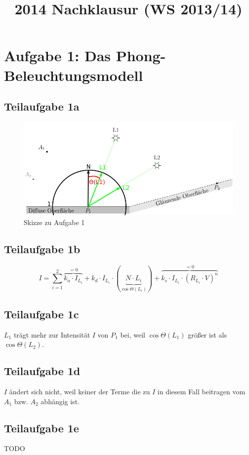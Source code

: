\documentclass[a4paper]{scrartcl}
\begin{document}
\title{2014 Nachklausur (WS 2013/14)}

\setcounter{section}{1}
\section*{Aufgabe 1: Das Phong-Beleuchtungsmodell}
\subsection*{Teilaufgabe 1a}
\begin{figure}[h]
    \centering
    \includegraphics*[width=0.8\linewidth, keepaspectratio]{1a.png}
    \caption{Skizze zu Aufgabe 1}
    \label{fig:1a}
\end{figure}

\subsection*{Teilaufgabe 1b}

\[I = \sum_{i=1}^2 \overbrace{k_a \cdot I_{L_i}}^{=0} + k_d \cdot I_{L_i} \cdot (\underbrace{N \cdot L_{i}}_{\cos \Theta({L_i})}) + \overbrace{k_s \cdot I_{L_i} \cdot (R_{L_i} \cdot V)^n}^{=0}\]

\subsection*{Teilaufgabe 1c}
$L_1$ trägt mehr zur Intensität $I$ von $P_1$ bei, weil $\cos \Theta(L_1)$ größer
ist als  $\cos \Theta(L_2)$.

\subsection*{Teilaufgabe 1d}
$I$ ändert sich nicht, weil keiner der Terme die zu $I$ in diesem Fall beitragen
vom $A_1$ bzw. $A_2$ abhängig ist.

\subsection*{Teilaufgabe 1e}
TODO
\end{document}
